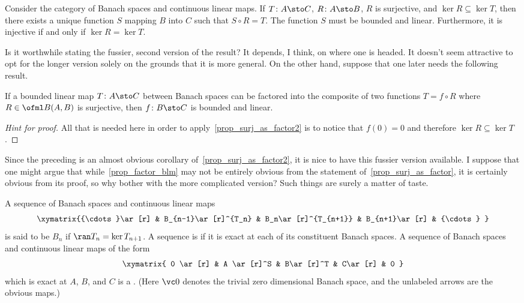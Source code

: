\begin{prop}\label{prop_surj_as_factor2} Consider the category of Banach spaces
and continuous linear maps.  If $T\colon A \sto C$, $R\colon A \sto B$, $R$ is
surjective, and $\ker R \subseteq \ker T$, then there exists a unique function
$S$ mapping $B$ into $C$ such that $S\circ R = T$.  The function $S$ must be
bounded and linear.  Furthermore, it is injective if and only if $\ker R = \ker T$.
\end{prop}

Is it worthwhile stating the fussier, second version of the result? It depends, I think, on
where one is headed.  It doesn't seem attractive to opt for the longer version solely on the
grounds that it is more general.  On the other hand, suppose that one later needs the following result.

\begin{prop}\label{prop_factor_blm} If a bounded linear map $T\colon A \sto C$ between Banach spaces can be factored
into the composite of two functions $T = f \circ R$ where $R \in \ofml B(A,B)$ is surjective,
then $f \colon B \sto C$ is bounded and linear.
\end{prop}

\begin{proof}[\emph{Hint for proof}] All that is needed here in order to apply~\ref{prop_surj_as_factor2}
is to notice that $f(0) = 0$ and therefore $\ker R \subseteq \ker T$.   \ns
\end{proof}

Since the preceding is an almost obvious corollary of~\ref{prop_surj_as_factor2}, it is nice to have
this fussier version available.  I suppose that one might argue that while~\ref{prop_factor_blm} may not be
entirely obvious from the statement of~\ref{prop_surj_as_factor}, it is certainly obvious from its
proof, so why bother with the more complicated version?  Such things are surely a matter of taste.

\begin{defn}\label{defn_Bsp_exact_seq}  A sequence of Banach spaces and continuous linear maps
   \[\xymatrix{{\cdots}\ar[r] & B_{n-1}\ar[r]^{T_n}
          & B_n\ar[r]^{T_{n+1}} & B_{n+1}\ar[r] & {\cdots}
   }\]
is said to be
 $B_n$ if $\ran T_n = \ker T_{n+1}$. A sequence is  if it is
exact at each of its constituent Banach spaces.  A sequence of Banach spaces and
continuous linear maps of the form
   \begin{equation}\label{001500202i}\xymatrix{
      0 \ar[r] & A \ar[r]^S & B\ar[r]^T & C\ar[r] & 0
   }\end{equation}
which is exact at $A$, $B$, and $C$ is a .  (Here $\vc 0$ denotes the trivial zero dimensional
Banach space, and the unlabeled arrows are the obvious maps.)
\end{defn}

